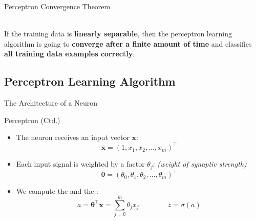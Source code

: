 \begin{frame}{Perceptron Convergence Theorem}{}
	\begin{boxBlue}
		 \\

		If the training data is \textbf{linearly separable}, then the perceptron learning algorithm is going to
		\textbf{converge after a finite amount of time} and classifies \textbf{all training data examples correctly}.
	\end{boxBlue}
\end{frame}


\subsection{Perceptron Learning Algorithm}

\begin{frame}{The Architecture of a Neuron}{}
	
\end{frame}


\begin{frame}{Perceptron (Ctd.)}{}
	\begin{itemize}
		\item The neuron receives an input vector $\bm{x}$:
		\begin{equation*}
			\bm{x} = (1, x_1, x_2, \dots, x_m)^{\intercal}
		\end{equation*}
		\item Each input signal is weighted by a factor $\theta_j$: {\footnotesize\textit{(weight of synaptic strength)}}
		\begin{equation*}
			\bm{\theta} = (\theta_0, \theta_1, \theta_2, \dots, \theta_m)^{\intercal}
		\end{equation*}
		\item We compute the  and the :
		\begin{equation}
			a = \bm{\theta}^{\intercal} \bm{x} = \sum_{j=0}^m \theta_j x_j \qquad\qquad
			z = \sigma(a)
		\end{equation}
	\end{itemize}
\end{frame}


